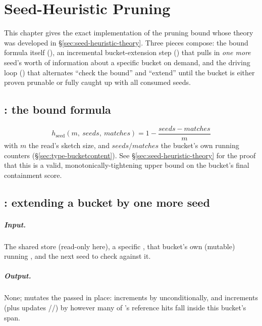 \chapter{Seed-Heuristic Pruning}
\label{ch:pruning}

This chapter gives the exact implementation of the pruning bound whose theory was developed in
\S\ref{sec:seed-heuristic-theory}. Three pieces compose: the bound formula itself (),
an incremental bucket-extension step () that pulls in \emph{one more}
seed's worth of information about a specific bucket on demand, and the driving loop
() that alternates ``check the bound'' and ``extend'' until the bucket
is either proven prunable or fully caught up with all consumed seeds.

\section{: the bound formula}

\[
  h_{\mathrm{seed}}(m,\ \mathit{seeds},\ \mathit{matches}) = 1 - \frac{\mathit{seeds} -
  \mathit{matches}}{m}
\]
with $m$ the read's sketch size, and $\mathit{seeds}/\mathit{matches}$ the bucket's own running
counters (\S\ref{sec:type-bucketcontent}). See \S\ref{sec:seed-heuristic-theory} for the proof
that this is a valid, monotonically-tightening upper bound on the bucket's final containment
score.

\section{: extending a bucket by one more seed}
\label{sec:matches-in-bucket}

\paragraph{Input.} The shared  store (read-only here), a specific
, that bucket's own (mutable) running , and the next seed
 to check against it.

\paragraph{Output.} None; mutates the passed  in place: increments
 by  unconditionally, and increments  (plus
updates //) by however many of 's reference
hits fall inside this bucket's span.

